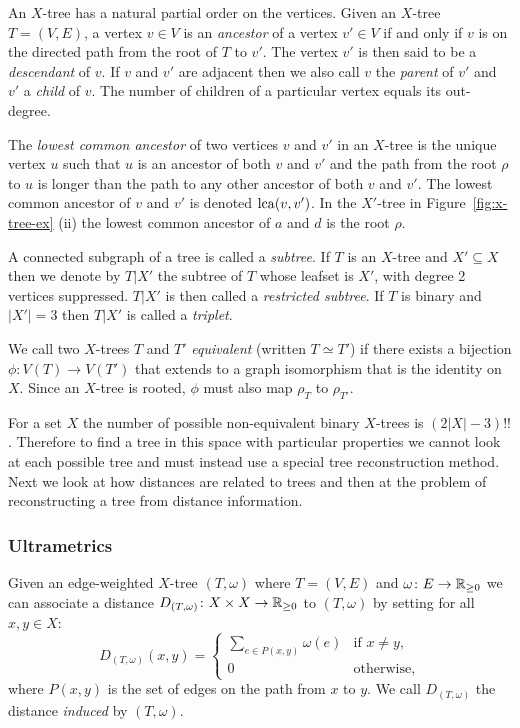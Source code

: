 An $X$-tree has a natural partial order on the vertices.  Given an $X$-tree
$T=(V,E)$, a vertex $v \in V$ is an \textit{ancestor} of a vertex $v' \in V$
if and only if $v$ is on the directed path from the root of $T$ to $v'$.  The
vertex $v'$ is then said to be a \textit{descendant} of $v$.  If $v$ and $v'$
are adjacent then we also call $v$ the \textit{parent} of $v'$ and $v'$ a
\textit{child} of $v$.  The number of children of a particular vertex equals
its out-degree.

The \textit{lowest common ancestor} of two vertices $v$ and $v'$ in an
$X$-tree is the unique vertex $u$ such that $u$ is an ancestor of both $v$ and
$v'$ and the path from the root $\rho$ to $u$ is longer than the path to any
other ancestor of both $v$ and $v'$.  The lowest common ancestor of $v$ and
$v'$ is denoted $\operatorname{lca}(v,v')$.  In the $X'$-tree in Figure~\ref{fig:x-tree-ex}
(ii) the lowest common ancestor of $a$ and $d$ is the root $\rho$.

A connected subgraph of a tree is called a \textit{subtree}.  If $T$ is an
$X$-tree and $X' \subseteq X$ then we denote by $T|X'$ the subtree of $T$
whose leafset is $X'$, with degree 2 vertices suppressed.  $T|X'$ is then
called a \textit{restricted subtree}.  If $T$ is binary and $|X'| = 3$ then
$T|X'$ is called a \textit{triplet}.

We call two $X$-trees $T$ and $T'$ \textit{equivalent} (written $T \simeq T'$)
if there exists a bijection $\phi \colon V(T) \to V(T')$ that extends to a
graph isomorphism that is the identity on $X$.  Since an $X$-tree is rooted,
$\phi$ must also map $\rho_{T}$ to $\rho_{T'}$.

For a set $X$ the number of possible non-equivalent binary $X$-trees is
$(2|X|-3)!!$.  Therefore to find a tree in this space with particular
properties we cannot look at each possible tree and must instead use a special
tree reconstruction method.  Next we look at how distances are related to
trees and then at the problem of reconstructing a tree from distance
information.

\subsubsection{Ultrametrics}
\label{sec:ultrametrics}

Given an edge-weighted $X$-tree $(T,\omega)$ where $T=(V,E)$ and $\omega
\colon E \to {\mathbb R}_{\geq 0}$ we can associate a distance $D_{(T,\omega)} \colon X
\times X \to {\mathbb R}_{\geq 0}$ to $(T,\omega)$ by setting for all $x,y \in X$:
\begin{equation*}
  D_{(T,\omega)}(x,y) =
  \begin{cases}
    \displaystyle
    \sum_{e \in P(x,y)} \omega(e) & \text{if $x \neq y$},\\
    0 & \text{otherwise,}
  \end{cases}
\end{equation*}
where $P(x,y)$ is the set of edges on the path from $x$ to $y$.  We call
$D_{(T,\omega)}$ the distance \textit{induced} by $(T,\omega)$.  

